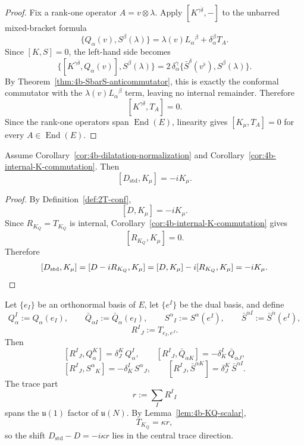 \begin{proof}
Fix a rank-one operator \(A=v\otimes\lambda\). Apply
\([K^{\gamma\dot\delta},-]\) to the unbarred mixed-bracket formula
\[
\{Q_\alpha(v),S^\beta(\lambda)\}
=
\lambda(v)L_\alpha{}^\beta+\delta_\alpha^\beta T_A.
\]
Since \([K,S]=0\), the left-hand side becomes
\[
\{[K^{\gamma\dot\delta},Q_\alpha(v)],S^\beta(\lambda)\}
=
2\,\delta_\alpha^\gamma\{\bar S^{\dot\delta}(v^\flat),S^\beta(\lambda)\}.
\]
By Theorem~\ref{thm:4b-SbarS-anticommutator}, this is exactly the conformal
commutator with the \(\lambda(v)L_\alpha{}^\beta\) term, leaving no internal
remainder. Therefore
\[
[K^{\gamma\dot\delta},T_A]=0.
\]
Since the rank-one operators span \(\operatorname{End}(E)\), linearity gives
\([K_\mu,T_A]=0\) for every \(A\in\operatorname{End}(E)\).
\end{proof}

\begin{corollary}
\label{cor:4b-dstd-K}
Assume Corollary~\ref{cor:4b-dilatation-normalization} and
Corollary~\ref{cor:4b-internal-K-commutation}. Then
\[
[D_{\mathrm{std}},K_\mu]=-iK_\mu.
\]
\end{corollary}

\begin{proof}
By Definition~\ref{def:2T-conf},
\[
[D,K_\mu]=-iK_\mu.
\]
Since \(R_{K_Q}=T_{K_Q}\) is internal, Corollary~\ref{cor:4b-internal-K-commutation}
gives
\[
[R_{K_Q},K_\mu]=0.
\]
Therefore
\[
[D_{\mathrm{std}},K_\mu]
=
[D-iR_{K_Q},K_\mu]
=
[D,K_\mu]-i[R_{K_Q},K_\mu]
=
-iK_\mu.
\qedhere
\]
\end{proof}

\begin{remark}
Let \(\{e_I\}\) be an orthonormal basis of \(E\), let \(\{e^I\}\) be the dual
basis, and define
\[
  Q_\alpha^I:=Q_\alpha(e_I),
  \qquad
  \bar Q_{\dot\alpha I}:=\bar Q_{\dot\alpha}(e_I),
  \qquad
  S^\alpha{}_I:=S^\alpha(e^I),
  \qquad
  \bar S^{\dot\alpha I}:=\bar S^{\dot\alpha}(e^I),
\]
\[
  R^I{}_J:=T_{e_I,e^J}.
\]
Then
\[
  [R^I{}_J,Q_\alpha^K]=\delta_J^K\,Q_\alpha^I,
  \qquad
  [R^I{}_J,\bar Q_{\dot\alpha K}]=-\delta_K^I\,\bar Q_{\dot\alpha J},
\]
\[
  [R^I{}_J,S^\alpha{}_K]=-\delta_K^I\,S^\alpha{}_J,
  \qquad
  [R^I{}_J,\bar S^{\dot\alpha K}]=\delta_J^K\,\bar S^{\dot\alpha I}.
\]
The trace part
\[
  r:=\sum_I R^I{}_I
\]
spans the \(\mathfrak u(1)\) factor of \(\mathfrak u(N)\). By
Lemma~\ref{lem:4b-KQ-scalar},
\[
  T_{K_Q}=\kappa r,
\]
so the shift \(D_{\mathrm{std}}-D=-i\kappa r\) lies in the central trace
direction.
\end{remark}

